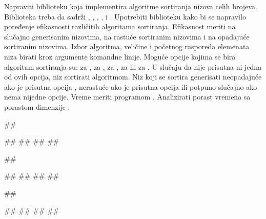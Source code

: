 \begin{Answer}[ref=504]
\end{Answer}
\begin{Exercise}[label=507]
  Napraviti biblioteku koja implementira algoritme sortiranja nizova
  celih brojeva. Biblioteka treba da sadrži ,
  , , ,  i
  . Upotrebiti biblioteku kako bi se napravilo
  poređenje efikasnosti različitih algoritama sortiranja. Efikasnost
  meriti na slučajno generisanim nizovima, na rastuće sortiranim
  nizovima i na opadajuće sortiranim nizovima. Izbor algoritma,
  veličine i početnog rasporeda elemenata niza birati kroz argumente
  komandne linije. Moguće opcije kojima se bira algoritam sortiranja
  su:  za ,  za ,
   za ,  za  ili
   za . U slučaju da nije prisutna ni
  jedna od ovih opcija, niz sortirati 
  algoritmom. Niz koji se sortira generisati neopadajuće ako je
  prisutna opcija , nerastuće ako je prisutna opcija
   ili potpuno slučajno ako nema nijedne opcije. Vreme meriti
  programom . Analizirati porast vremena sa porastom
  dimenzije .

\begin{minitest}
\begin{test}{1}
##
  
#\naslovIzlaz#
##
##
##
\end{test}
\end{minitest}
\begin{minitest}
\begin{test}{2}
##
  
#\naslovIzlaz#
##
##
##
\end{test}
\end{minitest}
\begin{minitest}
\begin{test}{3}
##
  
#\naslovIzlaz#
##
##
##
\end{test}
\end{minitest}


\end{Exercise}

